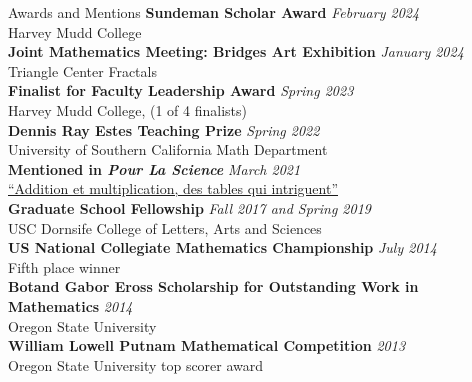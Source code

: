\documentclass{cv} %
\begin{document}
\begin{rSection}{Awards and Mentions}
  \textbf{Sundeman Scholar Award} \hfill \textit{February 2024}
  \\ Harvey Mudd College
  \\
  \textbf{Joint Mathematics Meeting: Bridges Art Exhibition} \hfill \textit{January 2024}
  \\ Triangle Center Fractals
  \\
  \textbf{Finalist for Faculty Leadership Award} \hfill \textit{Spring 2023}
  \\ Harvey Mudd College, (1 of 4 finalists)
  \\
  \textbf{Dennis Ray Estes Teaching Prize} \hfill \textit{Spring 2022}
  \\ University of Southern California Math Department
  \\
  \textbf{Mentioned in \textit{Pour La Science}} \hfill \textit{March 2021}
  \\ \href{https://www.pourlascience.fr/sr/logique-calcul/addition-et-multiplication-des-tables-qui-intriguent-21615.php}{``Addition et multiplication, des tables qui intriguent''}
  \\
  \textbf{Graduate School Fellowship} \hfill \textit{Fall 2017 and Spring 2019}
  \\ USC Dornsife College of Letters, Arts and Sciences
  \\
  \textbf{US National Collegiate Mathematics Championship} \hfill \textit{July 2014}
  \\ Fifth place winner
  \\
  \textbf{Botand Gabor Eross Scholarship for Outstanding Work in Mathematics} \hfill \textit{2014}
  \\ Oregon State University
  \\
  \textbf{William Lowell Putnam Mathematical Competition} \hfill \textit{2013}
  \\ Oregon State University top scorer award
  \\
\end{rSection}
\end{document}
